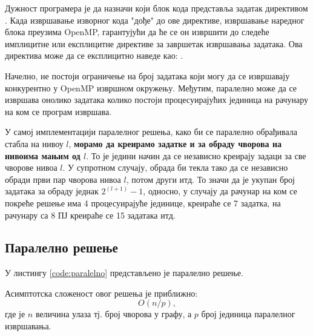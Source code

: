 Дужност програмера је да назначи који блок кода представља задатак директивом .
Када извршавање изворног кода "дође" до ове директиве, извршавање наредног блока преузима OpenMP,
гарантујући да ће се он извршити до следеће имплицитне или експлицитне директиве за завршетак извршавања задатака.
Ова директива може да се експлицитно наведе као: .

Начелно, не постоји ограничење на број задатака који могу да се извршавају конкурентно у OpenMP извршном окружењу.
Међутим, паралелно може да се извршава онолико задатака колико постоји процесуирајућих јединица на рачунару на ком
се програм извршава.

У самој имплементацији паралелног решења, како би се паралелно обрађивала стабла на нивоу $l$, \textbf{морамо да
креирамо задатке и за обраду чворова на нивоима мањим од $l$}.
То је једини начин да се независно креирају задаци за све чворове нивоа $l$. У супротном случају,
обрада би текла тако да се независно обради први пар чворова нивоа $l$, потом други итд.
То значи да је укупан број задатака за обраду једнак $2^(l+1) - 1$, односно, у случају да рачунар на ком се покреће решење има
4 процесуирајуће јединице, креираће се 7 задатка, на рачунару са 8 ПЈ креираће се 15 задатака итд.

\subsection{Паралелно решење}

У листингу \ref{code:paralelno} представљено је паралелно решење. 


Асимптотска сложеност овог решења је приближно:
$$O(n/p),$$
где је $n$ величина улаза тј. број чворова у графу, а $p$ број јединица паралелног извршавања.

\pagebreak
